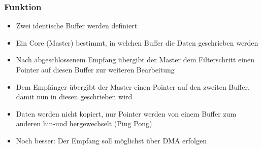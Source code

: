 \subsubsection{Funktion}
\begin{itemize}
	\item Zwei identische Buffer werden definiert
	\item Ein Core (Master) bestimmt, in welchen Buffer die Daten geschrieben werden
	\item Nach abgeschlossenem Empfang übergibt der Master dem Filterschritt einen Pointer auf diesen Buffer zur weiteren Bearbeitung
	\item Dem Empfänger übergibt der Master einen Pointer auf den zweiten Buffer, damit nun in diesen geschrieben wird
	\item Daten werden nicht kopiert, nur Pointer werden von einem Buffer zum anderen hin-und hergewechselt (Ping Pong)
	\item Noch besser: Der Empfang soll möglichst über DMA erfolgen
\end{itemize}
